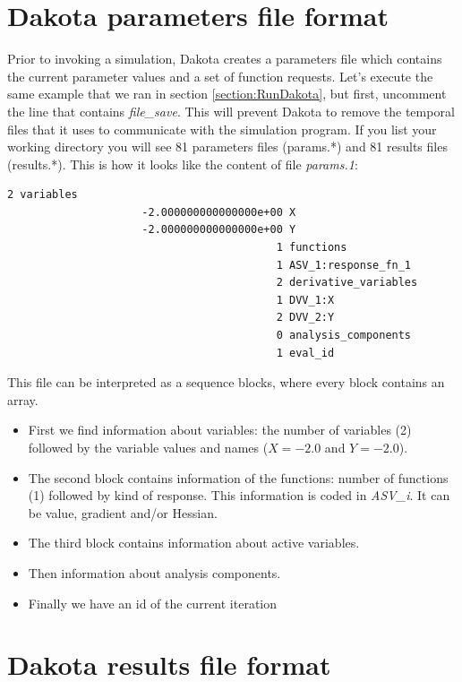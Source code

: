 \documentclass[12pt,a4paper,article]{memoir}
\begin{document}
\section{Dakota parameters file format}

Prior to invoking a simulation, Dakota creates a parameters file which contains the current parameter values and a set of function requests. Let's execute the same example that we ran in section \ref{section:RunDakota}, but first, uncomment the line that contains \textit{file\_save}. This will prevent Dakota to remove the temporal files that it uses to communicate with the simulation program. If you list your working directory you will see 81 parameters files (params.*) and 81 results files (results.*). This is how it looks like the content of file \textit{params.1}:

\begin{lstlisting}[style=MyCodeStyle,language=bash]
                                          2 variables
                     -2.000000000000000e+00 X
                     -2.000000000000000e+00 Y
                                          1 functions
                                          1 ASV_1:response_fn_1
                                          2 derivative_variables
                                          1 DVV_1:X
                                          2 DVV_2:Y
                                          0 analysis_components
                                          1 eval_id
\end{lstlisting}

This file can be interpreted as a sequence blocks, where every block contains an array.

\begin{itemize}
\item First we find information about variables: the number of variables (2) followed by the variable values and names ($X=-2.0$ and $Y=-2.0$).
\item The second block contains information of the functions: number of functions (1) followed by kind of response. This information is coded in \textit{ASV\_i}. It can be value, gradient and/or Hessian.
\item The third block contains information about active variables.
\item Then information about analysis components.
\item Finally we have an id of the current iteration 
\end{itemize}

\section{Dakota results file format}
\end{document}
